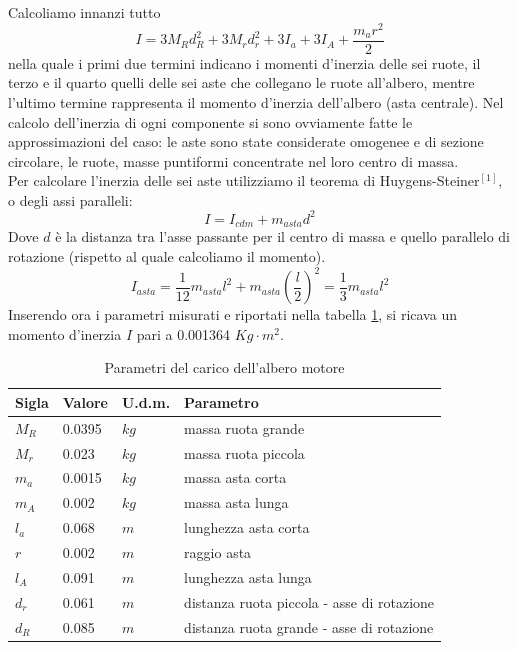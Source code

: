 Calcoliamo innanzi tutto 
$$
I=3M_Rd_R^2+3M_rd_r^2+3I_a+3I_A+\displaystyle\frac{m_ar^2}{2}
$$
nella quale i primi due termini indicano i momenti d'inerzia delle sei ruote, il terzo e il quarto quelli delle sei aste che collegano le ruote all'albero, mentre l'ultimo termine rappresenta il momento d'inerzia dell'albero (asta centrale). Nel calcolo dell'inerzia di ogni componente si sono ovviamente fatte le approssimazioni del caso: le aste sono state considerate omogenee e di sezione circolare, le ruote, masse puntiformi concentrate nel loro centro di massa.\\
Per calcolare l'inerzia delle sei aste utilizziamo il teorema di Huygens-Steiner$^{[1]}$, o degli assi paralleli:
$$
I=I_{cdm}+m_{asta}d^2
$$
Dove $d$ è la distanza tra l'asse passante per il centro di massa e quello parallelo di rotazione (rispetto al quale calcoliamo il momento).\\
$$
I_{asta}=\displaystyle\frac{1}{12}m_{asta}l^2+m_{asta}(\displaystyle\frac{l}{2})^2=\displaystyle\frac{1}{3}m_{asta}l^2
$$
Inserendo ora i parametri misurati  e riportati nella tabella \ref{Inerzia}, si ricava un momento d'inerzia $I$ pari a 0.001364 $Kg\cdot m^2$.
\begin{table}[ht]
	\begin{tabular}{|l|l|l|l|}
		\hline
		\textbf{Sigla} & \textbf{Valore} & \textbf{U.d.m.} & \textbf{Parametro}\\
		\hline
		$M_R$ & 0.0395 & $kg$ & massa ruota grande\\
		\hline
		$M_r$ & 0.023 & $kg$ & massa ruota piccola\\
		\hline
		$m_a$ & 0.0015 & $kg$ & massa asta corta\\	
		\hline
		$m_A$ & 0.002 & $kg$ & massa asta lunga\\	
		\hline
		$l_a$ & 0.068 & $m$ & lunghezza asta corta\\
		\hline
		$r$ & 0.002 & $m$ & raggio asta\\
		\hline
		$l_A$ & 0.091 & $m$ & lunghezza asta lunga\\
		\hline
		$d_r$ & 0.061 & $m$ & distanza ruota piccola - asse di rotazione\\
		\hline
		$d_R$ & 0.085 & $m$  & distanza ruota grande - asse di rotazione\\
		\hline
	\end{tabular}
\caption{Parametri del carico dell'albero motore}
\label{Inerzia}
\end{table}

